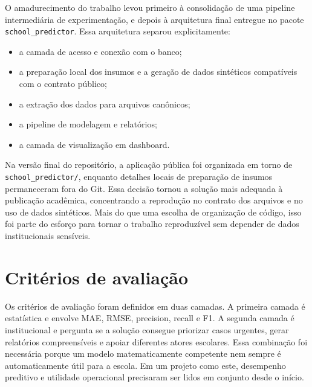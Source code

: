 O amadurecimento do trabalho levou primeiro \`a consolida\c{c}\~ao de uma pipeline intermedi\'aria de experimenta\c{c}\~ao, e depois \`a arquitetura final entregue no pacote \texttt{school\_predictor}. Essa arquitetura separou explicitamente:
\begin{itemize}
    \item a camada de acesso e conex\~ao com o banco;
    \item a prepara\c{c}\~ao local dos insumos e a gera\c{c}\~ao de dados sintéticos compat\'iveis com o contrato p\'ublico;
    \item a extra\c{c}\~ao dos dados para arquivos can\^onicos;
    \item a pipeline de modelagem e relat\'orios;
    \item a camada de visualiza\c{c}\~ao em dashboard.
\end{itemize}

Na vers\~ao final do reposit\'orio, a aplica\c{c}\~ao p\'ublica foi organizada em torno de \texttt{school\_predictor/}, enquanto detalhes locais de prepara\c{c}\~ao de insumos permaneceram fora do Git. Essa decis\~ao tornou a solu\c{c}\~ao mais adequada \`a publica\c{c}\~ao acad\^emica, concentrando a reprodu\c{c}\~ao no contrato dos arquivos e no uso de dados sintéticos. Mais do que uma escolha de organiza\c{c}\~ao de c\'odigo, isso foi parte do esfor\c{c}o para tornar o trabalho reproduz\'ivel sem depender de dados institucionais sens\'iveis.

\section{Crit\'erios de avalia\c{c}\~ao}
\label{sec:criterios-avaliacao}

Os crit\'erios de avalia\c{c}\~ao foram definidos em duas camadas. A primeira camada \'e estat\'istica e envolve MAE, RMSE, precision, recall e F1. A segunda camada \'e institucional e pergunta se a solu\c{c}\~ao consegue priorizar casos urgentes, gerar relat\'orios compreens\'iveis e apoiar diferentes atores escolares. Essa combina\c{c}\~ao foi necess\'aria porque um modelo matematicamente competente nem sempre \'e automaticamente \'util para a escola. Em um projeto como este, desempenho preditivo e utilidade operacional precisaram ser lidos em conjunto desde o in\'icio.
